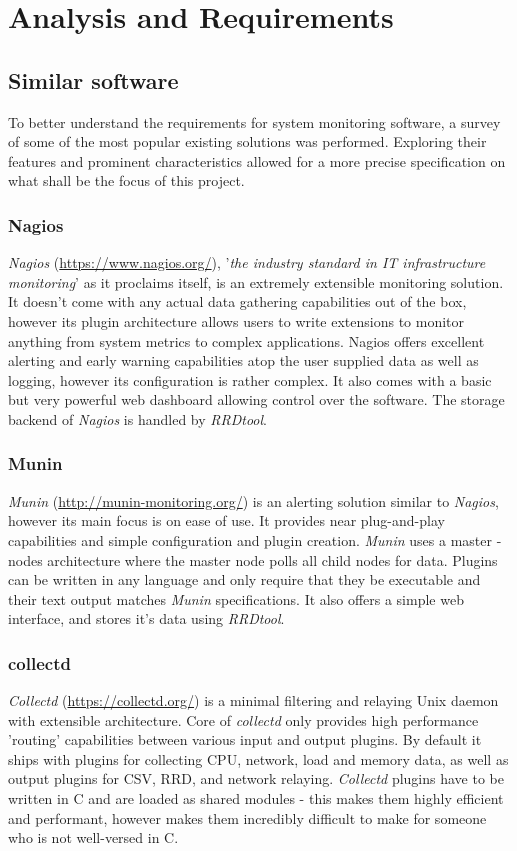 \section{Analysis and Requirements}
    \subsection{Similar software}\label{sec:similar-software}
        To better understand the requirements for system monitoring software, a survey of some of the most popular existing solutions was performed. Exploring their features and prominent characteristics allowed for a more precise specification on what shall be the focus of this project.

        \subsubsection{Nagios}
            \textit{Nagios} (\url{https://www.nagios.org/}), '\textit{the industry standard in IT infrastructure monitoring}' as it proclaims itself, is an extremely extensible monitoring solution. It doesn't come with any actual data gathering capabilities out of the box, however its plugin architecture allows users to write extensions to monitor anything from system metrics to complex applications. Nagios offers excellent alerting and early warning capabilities atop the user supplied data as well as logging, however its configuration is rather complex. It also comes with a basic but very powerful web dashboard allowing control over the software. The storage backend of \textit{Nagios} is handled by \textit{RRDtool}.
        \subsubsection{Munin}
            \textit{Munin} (\url{http://munin-monitoring.org/}) is an alerting solution similar to \textit{Nagios}, however its main focus is on ease of use. It provides near plug-and-play capabilities and simple configuration and plugin creation. \textit{Munin} uses a master - nodes architecture where
            the master node polls all child nodes for data. Plugins can be written in any language and only require that they be executable and their text output matches \textit{Munin} specifications. It also offers a simple web interface, and stores it's data using \textit{RRDtool}.
        \subsubsection{collectd}
            \textit{Collectd} (\url{https://collectd.org/}) is a minimal filtering and relaying Unix daemon with extensible architecture. Core of \textit{collectd} only provides high performance 'routing' capabilities between various input and output plugins. By default it ships with plugins for collecting CPU, network, load and memory data, as well as output plugins for CSV, RRD, and network relaying. \textit{Collectd} plugins have to be written in C and are loaded as shared modules - this makes them highly efficient and performant, however makes them incredibly difficult to make for someone who is not well-versed in C.

